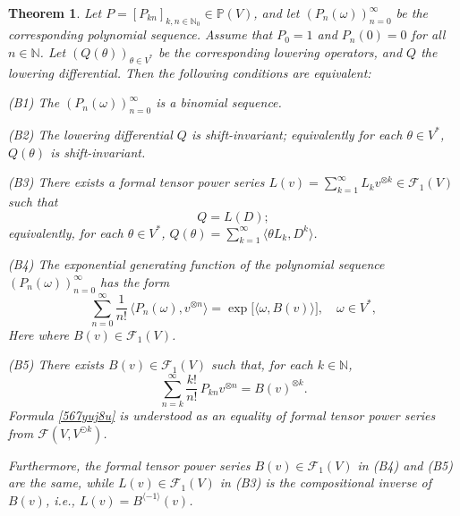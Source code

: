 \documentclass[12pt]{article}
\newtheorem{theorem}{Theorem}[section]
\theoremstyle{remark}
\theoremstyle{remark}
\theoremstyle{remark}
\begin{document}
\begin{theorem}\label{45678765g} Let $P=[P_{kn}]_{k,n\in \mathbb N_0}\in \mathbb P(V)$, and let $(P_n(\omega))_{n=0}^\infty$ be the corresponding polynomial sequence. Assume that $P_0=1$ and $P_n(0)=0$ for all $n\in\mathbb N$.  Let $(Q(\theta))_{\theta \in V^*}$ be the corresponding lowering operators, and $Q$ the lowering differential. Then the following conditions are equivalent:

{\rm (B1)} The $(P_n(\omega))_{n=0}^\infty$ is a binomial sequence. 

{\rm(B2)} The lowering differential $Q$ is shift-invariant; equivalently for each $\theta \in V^*$, $Q(\theta)$ is shift-invariant.

{\rm (B3)} There exists a formal tensor power series $L(v)=\sum_{k=1}^\infty L_k v^{\otimes k}\in\mathcal F_1(V)$ such that 
\begin{equation}\label{vcftdtrdsy6ek}
Q=L(D);\end{equation} 
equivalently, for each $\theta \in V^*$, $Q(\theta)=\sum_{k=1}^\infty \langle \theta L_k,D^{k}\rangle$.

{\rm(B4)} The exponential generating function of the polynomial sequence $(P_n(\omega))_{n=0}^\infty$  
 has the form 
\begin{equation}\label{trse5sw5w}
\sum_{n=0}^\infty \frac{1}{n!}\,\langle P_n(\omega),v^{\otimes n}\rangle= \exp\big[\langle \omega,B(v)\rangle\big],\quad \omega \in V^*,
\end{equation}
Here 
where $B(v)\in \mathcal F_1(V)$. 

{\rm(B5)} There exists $B(v)\in\mathcal F_1(V)$ such that, for each $k\in \mathbb N$, 
\begin{equation}\label{567yuj8u}\sum_{n=k}^\infty\frac{k!}{n!}\, P_{kn}v^{\otimes n}=B(v)^{\otimes k}.\end{equation}
Formula \eqref{567yuj8u} is understood as an equality of formal tensor power series from $\mathcal F(V,V^{\odot k})$.


Furthermore, the formal tensor power series $B(v)\in\mathcal F_1(V)$ in  {\rm (B4)} and {\rm (B5)} are the same, while $L(v)\in\mathcal F_1(V)$ in  {\rm (B3)} is the compositional inverse of $B(v)$, i.e., $L(v)=B^{\langle-1\rangle}(v)$.
\end{theorem}
\end{document}
